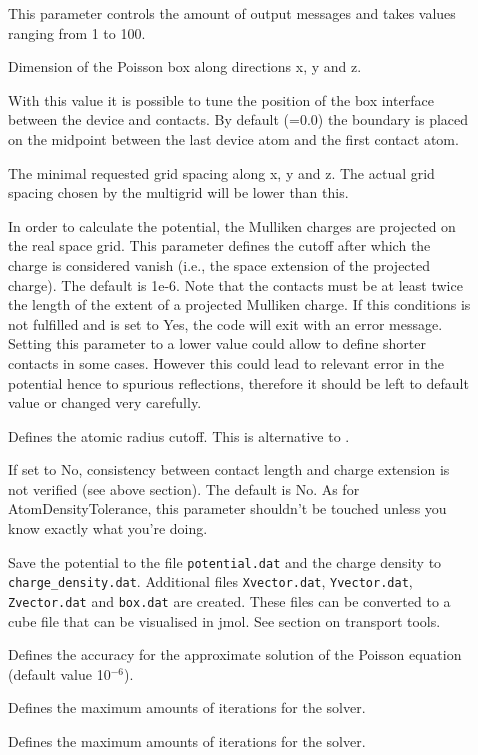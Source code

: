 \begin{description}
\item[] This parameter controls the amount of output messages
  and takes values ranging from 1 to 100.
\item[] Dimension of the Poisson box
  along directions x, y and z.
\item[] With this value it is possible 
  to tune the position of the box interface between the device and contacts.
  By default (=0.0) the boundary is placed on the midpoint
  between the last device atom and the first contact atom.
\item[] The minimal requested grid
  spacing along x, y and z. The actual grid spacing chosen by the multigrid will
  be lower than this.
\item[] In order to calculate the potential, the
  Mulliken charges are projected on the real space grid. This parameter
  defines the cutoff after which the charge is considered vanish (i.e., the
  space extension of the projected charge). The default is 1e-6. Note that the
  contacts must be at least twice the length of the extent of a projected
  Mulliken charge. If this conditions is not fulfilled and is set to Yes, the
  code will exit with an error message. Setting this parameter to a lower
  value could allow to define shorter contacts in some cases. However this
  could lead to relevant error in the potential hence to spurious reflections,
  therefore it should be left to default value or changed very carefully.
\item[]  Defines the atomic radius
  cutoff. This is alternative to .
\item[] If set to No, consistency between contact length and
  charge extension is not verified (see above section). The default is No. As
  for AtomDensityTolerance, this parameter shouldn't be touched unless you
  know exactly what you're doing.
\item[] Save the potential to the file \verb|potential.dat| and 
	the charge density to \verb|charge_density.dat|.
  Additional files \verb|Xvector.dat|, \verb|Yvector.dat|, \verb|Zvector.dat| and
  \verb|box.dat| are created. These files can be converted to a cube file that
  can be visualised in jmol. See section on transport tools.
\item[] Defines the accuracy for the approximate solution of
  the Poisson equation (default value 10$^{-6}$).
\item[] Defines the maximum amounts of iterations for
  the solver.
\item[] Defines the maximum amounts of iterations for
  the solver.
\end{description}

